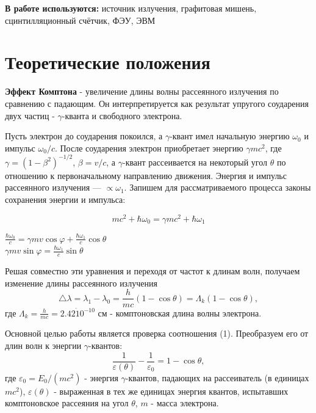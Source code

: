 \documentclass[a4paper, 12pt]{article}%
\begin{document}
\textbf{В работе используются:} источник излучения, графитовая мишень, сцинтилляционный счётчик, ФЭУ, ЭВМ

\section{Теоретические положения}
\textbf{Эффект Комптона} - увеличение длины волны рассеянного излучения по сравнению с падающим. Он интерпретируется как результат упругого соударения двух частиц - $\gamma$-кванта и свободного электрона. \par
Пусть электрон до соударения покоился, а  $\gamma$-квант имел начальную энергию $\omega_0$ и импульс $\omega_0/c$. После соударения электрон приобретает энергию $\gamma mc^2$, где $\gamma = (1 - \beta^2)^{-1/2}$, $\beta = v/c$, а  $\gamma$-квант рассеивается на некоторый угол $\theta$ по отношению
к первоначальному направлению движения. Энергия и импульс рассеянного излучения — $\propto \omega_1$. Запишем для рассматриваемого процесса законы сохранения энергии и импульса:

\begin{equation}
    mc^2 +\hbar \omega_0 = \gamma mc^2 +\hbar \omega_1
\label{1eq}
\end{equation}

\begin{center}
    $\frac{\hbar \omega_0}{c} = \gamma mv \cos \varphi + \frac{\hbar \omega_1}{c} \cos \theta$ \\
    $\gamma mv \sin \varphi = \frac{\hbar \omega_1}{c} \sin \theta$
\end{center}
Решая совместно эти уравнения и переходя от частот к длинам волн, получаем изменение длины рассеянного излучения
\begin{equation}
    \triangle \lambda = \lambda_1 - \lambda_0 = \frac{h}{mc}(1 - \cos \theta) = \Lambda_k(1 - \cos \theta),
\label{eq1}
\end{equation}
где $\Lambda_k = \frac{h}{mc} = 2.42 \dot 10^{-10}$ см - комптоновская длина волны электрона. \par
Основной целью работы является проверка соотношения (1). Преобразуем его от длин волн к энергии $\gamma$-квантов:
\begin{equation}
    \frac{1}{\varepsilon(\theta)} - \frac{1}{\varepsilon_0} = 1 - \cos \theta,
    \label{eq2}
\end{equation}
где $\varepsilon_0 = E_0/(mc^2)$ - энергия $\gamma$-квантов, падающих на рассеиватель (в единицах $mc^2$), $\varepsilon(\theta)$ - выраженная в тех же единицах энергия квантов, испытавших комптоновское рассеяния на угол $\theta$, $m$ - масса электрона.
\end{document}
